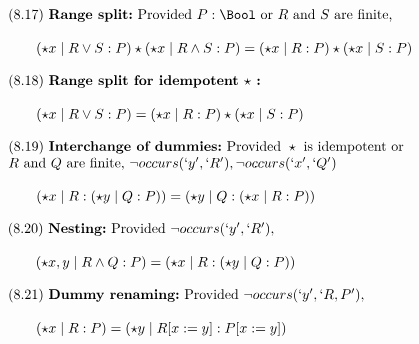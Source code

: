 $\begin{array}{l@{\quad}l}
   (8.17)~\textbf{Range split:}
   \text{ Provided } P:\Bool \text{ or } 
   R \text{ and } S \text{ are finite,}
\\ \\ \qquad
   (\star x \mid R \lor S : P) \star (\star x \mid R \land S : P)
   = (\star x \mid R : P) \star (\star x \mid S : P)
\end{array}$\newline\newline

$\begin{array}{l@{\quad}l}
   (8.18)~\textbf{Range split for idempotent $\star$ :}
 \\ \\ \qquad
   (\star x \mid R \lor S : P)
   = (\star x \mid R : P) \star (\star x \mid S : P)
\end{array}$\newline\newline

$\begin{array}{l@{\quad}l}
   (8.19)~\textbf{Interchange of dummies:}
   \text{ Provided } \star \text{ is idempotent or } \\
   R \text{ and } Q \text{ are finite, }  
   \lnot occurs(`y',`R'), \lnot occurs(`x',`Q')
\\ \\ \qquad
   (\star x \mid R : (\star y \mid Q : P)) 
   = (\star y \mid Q : (\star x \mid R : P))
\end{array}$\newline\newline

$\begin{array}{l@{\quad}l}
   (8.20)~\textbf{Nesting:} \text{ Provided } \lnot occurs(`y',`R'),
\\ \\ \qquad
   (\star x,y \mid R \land Q : P)
   = (\star x \mid R : (\star y \mid Q : P))
\end{array}$\newline\newline

$\begin{array}{l@{\quad}l}
   (8.21)~\textbf{Dummy renaming:} \text{ Provided } \lnot occurs(`y',`R,P'),
\\ \\ \qquad
   (\star x \mid R : P) = (\star y \mid R[x:=y] : P[x:=y])
\end{array}$\newline\newline

